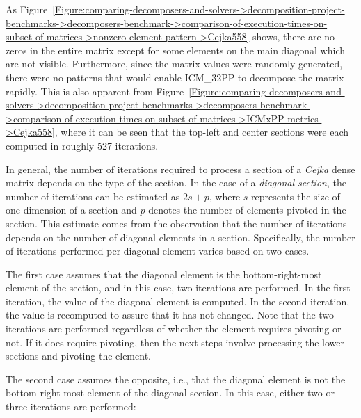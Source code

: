 As Figure~\ref{Figure:comparing-decomposers-and-solvers->decomposition-project-benchmarks->decomposers-benchmark->comparison-of-execution-times-on-subset-of-matrices->nonzero-element-pattern->Cejka558} shows, there are no zeros in the entire matrix except for some elements on the main diagonal which are not visible.
Furthermore, since the matrix values were randomly generated, there were no patterns that would enable ICM\_32PP to decompose the matrix rapidly.
This is also apparent from Figure~\ref{Figure:comparing-decomposers-and-solvers->decomposition-project-benchmarks->decomposers-benchmark->comparison-of-execution-times-on-subset-of-matrices->ICMxPP-metrics->Cejka558}, where it can be seen that the top-left and center sections were each computed in roughly 527 iterations.

In general, the number of iterations required to process a section of a \textit{Cejka} dense matrix depends on the type of the section.
In the case of a \textit{diagonal section}, the number of iterations can be estimated as $2s + p$, where $s$ represents the size of one dimension of a section and $p$ denotes the number of elements pivoted in the section.
This estimate comes from the observation that the number of iterations depends on the number of diagonal elements in a section.
Specifically, the number of iterations performed per diagonal element varies based on two cases.

The first case assumes that the diagonal element is the bottom-right-most element of the section, and in this case, two iterations are performed.
In the first iteration, the value of the diagonal element is computed.
In the second iteration, the value is recomputed to assure that it has not changed.
Note that the two iterations are performed regardless of whether the element requires pivoting or not.
If it does require pivoting, then the next steps involve processing the lower sections and pivoting the element.

The second case assumes the opposite, i.e., that the diagonal element is not the bottom-right-most element of the diagonal section.
In this case, either two or three iterations are performed:

